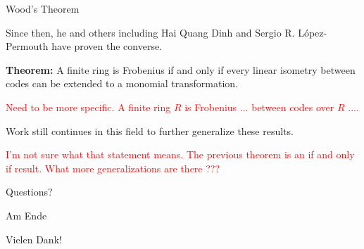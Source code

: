 \documentclass{beamer}
\begin{document}
\begin{frame}{Wood's Theorem}
    
    Since then, he and others including Hai Quang Dinh and Sergio R. L\'{o}pez-Permouth have proven
    the converse.

    \bigskip

    \pause

    \textbf{Theorem:} A finite ring is Frobenius if and only if every linear isometry between codes can
    be extended to a monomial transformation.
    
    \textcolor{red}{Need to be more specific.   A finite ring $R$ is Frobenius ... between codes over $R$ ....}

    \bigskip

    \pause

    Work still continues in this field to further generalize these results.
    
    \textcolor{red}{I'm not sure what that statement means.  The previous theorem is an if and only if result.  What more generalizations are there ???  }

\end{frame}

\begin{frame}

    \begin{center}
        Questions?
    \end{center}

\end{frame}

\begin{frame}{Am Ende}

    \begin{center}
        Vielen Dank!
    \end{center}

\end{frame}
\end{document}
